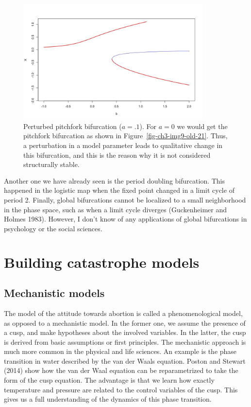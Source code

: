 \documentclass[
  letterpaper,
]{scrbook}
\begin{document}
\begin{figure}

{\centering \includegraphics[width=3.8477in,height=2.47114in]{media/ch3/image15.jpg}

}

\caption{\label{fig-ch3-img15-old-27}Perturbed pitchfork bifurcation
(\(a = .1\)). For \(a = 0\) we would get the pitchfork bifurcation as
shown in Figure~\ref{fig-ch3-img9-old-21}. Thus, a perturbation in a
model parameter leads to qualitative change in this bifurcation, and
this is the reason why it is not considered structurally stable.}

\end{figure}

Another one we have already seen is the period doubling bifurcation.
This happened in the logistic map when the fixed point changed in a
limit cycle of period 2. Finally, global bifurcations cannot be
localized to a small neighborhood in the phase space, such as when a
limit cycle diverges (Guckenheimer and Holmes 1983). However, I don't
know of any applications of global bifurcations in psychology or the
social sciences.

\hypertarget{building-catastrophe-models}{%
\section{Building catastrophe
models}\label{building-catastrophe-models}}

\hypertarget{mechanistic-models}{%
\subsection{Mechanistic models}\label{mechanistic-models}}

The model of the attitude towards abortion is called a phenomenological
model, as opposed to a mechanistic model. In the former one, we assume
the presence of a cusp, and make hypotheses about the involved
variables. In the latter, the cusp is derived from basic assumptions or
first principles. The mechanistic approach is much more common in the
physical and life sciences. An example is the phase transition in water
described by the van der Waals equation. Poston and Stewart (2014) show
how the van der Waal equation can be reparametrized to take the form of
the cusp equation. The advantage is that we learn how exactly
temperature and pressure are related to the control variables of the
cusp. This gives us a full understanding of the dynamics of this phase
transition.
\end{document}
